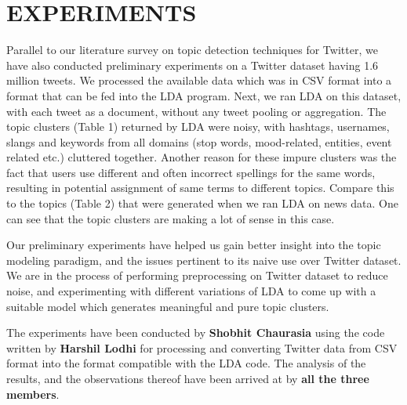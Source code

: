 \section{\uppercase{Experiments}}
Parallel to our literature survey on topic detection techniques for Twitter, we have also conducted preliminary experiments on a Twitter dataset having 1.6 million tweets. We processed the available data which was in CSV format into a format that can be fed into the LDA program. Next, we ran LDA on this dataset, with each tweet as a document, without any tweet pooling or aggregation. The topic clusters (Table 1) returned by LDA were noisy, with hashtags, usernames, slangs and keywords from all domains (stop words, mood-related, entities, event related etc.) cluttered together. Another reason for these impure clusters was the fact that users use different and often incorrect spellings for the same words, resulting in potential assignment of same terms to different topics. Compare this to the topics (Table 2) that were generated when we ran LDA on news data. One can see that the topic clusters are making a lot of sense in this case.

Our preliminary experiments have helped us gain better insight into the topic modeling paradigm, and the issues pertinent to its naive use over Twitter dataset. We are in the process of performing preprocessing on Twitter dataset to reduce noise, and experimenting with different variations of LDA to come up with a suitable model which generates meaningful and pure topic clusters.

The experiments have been conducted by {\bf Shobhit Chaurasia} using the code written by {\bf Harshil Lodhi} for processing and converting Twitter data from CSV format into the format compatible with the LDA code. The analysis of the results, and the observations thereof have been arrived at by {\bf all the three members}.
